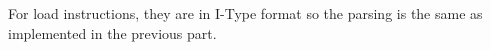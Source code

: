 \documentclass[12pt, a4paper]{article}
\begin{document}
\begin{ans}
For load instructions, they are in I-Type format so the parsing is the same as implemented in the previous part. 


\end{ans}
\pagebreak
\end{document}

